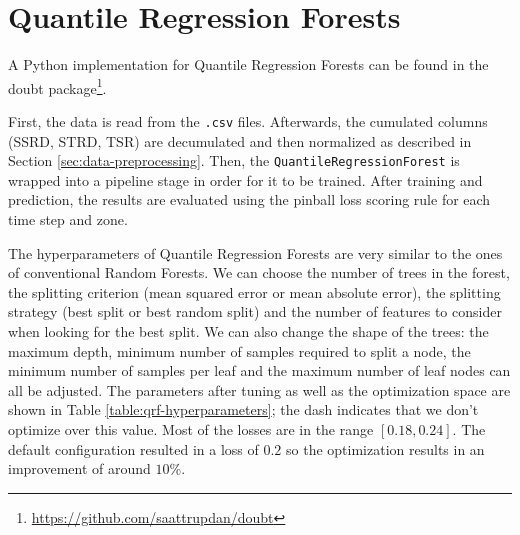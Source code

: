 \section{Quantile Regression Forests}
\label{sec:implementation-qrf}

A Python implementation for Quantile Regression Forests can 
be found in the doubt package\footnote{\url{https://github.com/saattrupdan/doubt}}.

First, the data is read from the \texttt{.csv} files. 
Afterwards, the cumulated columns (SSRD, STRD, TSR) are decumulated and then normalized 
as described in Section \ref{sec:data-preprocessing}.
Then, the \texttt{QuantileRegressionForest} is wrapped into a pipeline stage in order for 
it to be trained.
After training and prediction, the results are evaluated 
using the pinball loss scoring rule for each time step and zone.

The hyperparameters of Quantile Regression Forests are very similar to the ones 
of conventional Random Forests. We can choose the number of trees in the forest, 
the splitting criterion (mean squared error or mean absolute error), 
the splitting strategy (best split or best random split) 
and the number of features to consider when looking for the best split. 
We can also change the shape of the trees: 
the maximum depth, minimum number of samples required to split a node, the minimum number of samples per leaf and 
the maximum number of leaf nodes can all be adjusted.
The parameters after tuning as well as the optimization space 
are shown in Table \ref{table:qrf-hyperparameters}; the dash indicates that we don't optimize over this value.
Most of the losses are in the range \([0.18, 0.24]\). 
The default configuration resulted in a loss of \(0.2\) so 
the optimization results in an improvement of around \(10\%\).

